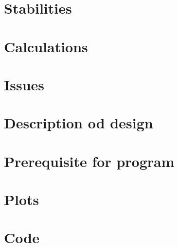 \begin{appendix}
	\chapter{Stabilities}\label{app:stabilities}
		
	\chapter{Calculations}
		
	\chapter{Issues}
		
	\chapter{Description od design}
		
	\chapter{Prerequisite for program}
		
	\chapter{Plots}
		
		
		
	\chapter{Code}
		
\end{appendix}
